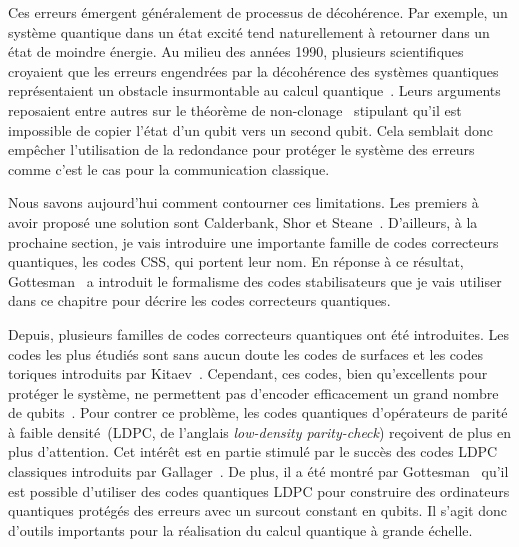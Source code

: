 Ces erreurs émergent généralement de processus de décohérence.
Par exemple,
un système quantique dans un état excité tend naturellement à retourner dans un état de moindre énergie.
Au milieu des années 1990,
plusieurs scientifiques croyaient que
les erreurs engendrées par la décohérence des systèmes quantiques
représentaient un obstacle insurmontable au calcul quantique~\cite{unruh_maintaining_1995, palma_quantum_1996, landauer_is_1995, chuang_quantum_1995}.
Leurs arguments reposaient entre autres sur le théorème de non-clonage~\cite{wootters_single_1982}
stipulant qu'il est impossible de copier l'état d'un qubit vers un second qubit.
Cela semblait donc empêcher l'utilisation de la redondance pour 
protéger le système des erreurs comme c'est le cas pour la communication classique.

Nous savons aujourd'hui comment contourner ces limitations. 
Les premiers à avoir proposé une solution sont Calderbank, Shor et Steane~\cite{calderbank_good_1996, steane_multiple-particle_nodate}.
D'ailleurs, à la prochaine section,
je vais introduire une importante famille de codes correcteurs quantiques, les codes CSS, qui portent leur nom.
En réponse à ce résultat, Gottesman~\cite{gottesman_stabilizer_1997} a introduit le formalisme des codes stabilisateurs
que je vais utiliser dans ce chapitre pour décrire les codes correcteurs quantiques.

Depuis,
plusieurs familles de codes correcteurs quantiques ont été introduites.
Les codes les plus étudiés sont sans aucun doute les codes de surfaces et 
les codes toriques introduits par Kitaev~\cite{kitaev_fault-tolerant_2003}.
Cependant,
ces codes, bien qu'excellents pour protéger le système,
ne permettent pas d'encoder efficacement un grand nombre de qubits~\cite{bravyi_tradeoffs_2010}.
Pour contrer ce problème,
les codes quantiques d'opérateurs de parité à faible 
densité~(LDPC, de l'anglais \textit{low-density parity-check})
reçoivent de plus en plus d'attention.
Cet intérêt est en partie stimulé par le succès des codes LDPC classiques introduits
par Gallager~\cite{gallager_low-density_1962}.
De plus, il a été montré par Gottesman~\cite{gottesman_fault-tolerant_2013}
qu'il est possible d'utiliser des codes quantiques LDPC pour 
construire des ordinateurs quantiques protégés des erreurs avec 
un surcout constant en qubits.
Il s'agit donc d'outils importants pour la réalisation du calcul quantique à grande échelle.

